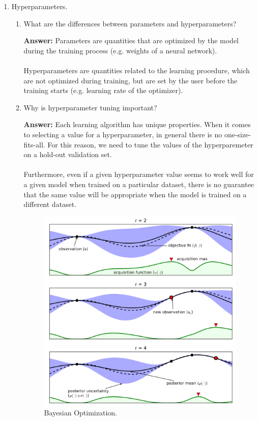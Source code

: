 \documentclass{article}
\newenvironment{QandA}{\begin{enumerate}[label=\arabic*.]}{\end{enumerate}}
\newenvironment{InnerQandA}{\begin{enumerate}[label=\roman*.]}{\end{enumerate}}
\newenvironment{answer}{\par\normalfont \textbf{Answer:}}{}
\begin{document}
\begin{QandA}
\begin{answer}
        (See more \href{https://blog.paperspace.com/intro-to-optimization-in-deep-learning-gradient-descent/}{here})
    \end{answer}

    \item Hyperparameters.
    \begin{InnerQandA}
        \item What are the differences between parameters and hyperparameters?
        \begin{answer}
            Parameters are quantities that are optimized by the model during the training process (e.g. weights of a neural network). \\\\
            Hyperparameters are quantities related to the learning procedure, which are not optimized during training, but are set by the user before the training starts (e.g. learning rate of the optimizer).
        \end{answer}

        \item Why is hyperparameter tuning important?
        \begin{answer}
            Each learning algorithm has unique properties. When it comes to selecting a value for a hyperparameter, in general there is no one-size-fits-all. For this reason, we need to tune the values of the hyperparemeter on a hold-out validation set. \\\\
            Furthermore, even if a given hyperparameter value seems to work well for a given model when trained on a particular dataset, there is no guarantee that the same value will be appropriate when the model is trained on a different dataset.
        \end{answer}
        \begin{figure}
            \centering
            \includegraphics[width=0.7\columnwidth]{img/bo.png}
            \caption{Bayesian Optimization\footnotemark.}
            \label{fig:bo}
        \end{figure}
        

\end{InnerQandA}
\end{QandA}
\end{document}
